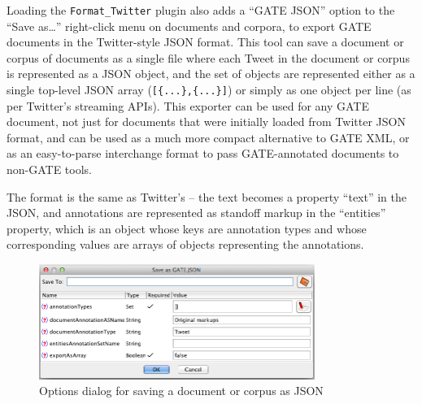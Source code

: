 Loading the \verb!Format_Twitter! plugin also adds a ``GATE JSON'' option to the
``Save as\ldots'' right-click menu on documents and corpora, to export GATE
documents in the Twitter-style JSON format.  This tool can save a document or
corpus of documents as a single file where each Tweet in the document or corpus
is represented as a JSON object, and the set of objects are represented either
as a single top-level JSON array (\verb![{...},{...}]!) or simply as one object
per line (as per Twitter's streaming APIs).  This exporter can be used for any
GATE document, not just for documents that were initially loaded from Twitter
JSON format, and can be used as a much more compact alternative to GATE XML, or
as an easy-to-parse interchange format to pass GATE-annotated documents to
non-GATE tools.

The format is the same as Twitter's -- the text becomes a property ``text'' in
the JSON, and annotations are represented as standoff markup in the
``entities'' property, which is an object whose keys are annotation types and
whose corresponding values are arrays of objects representing the annotations.

\begin{figure}[htb]
  \centering
  \includegraphics[width=0.8\textwidth]{save-as-json.png}
  \caption{Options dialog for saving a document or corpus as JSON}
  \label{fig:social:save-as-json}
\end{figure}

